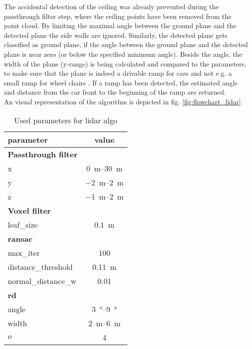 The accidental detection of the ceiling was already prevented during the passthrough filter step, where the ceiling points have been removed from the point cloud.
By limiting the maximal angle between the ground plane and the detected plane the side walls are ignored.
Similarly, the detected plane gets classified as ground plane, if the angle between the ground plane and the detected plane is near zero (or below the specified minimum angle).
Beside the angle, the width of the plane (y-range) is being calculated and compared to the parameters, to make sure that the plane is indeed a drivable ramp for cars and not e.g. a small ramp for wheel chairs .
If a ramp has been detected, the estimated angle and distance from the car front to the beginning of the ramp are returned.\\
An visual representation of the algorithm is depicted in fig. \ref{fig:flowchart_lidar}.
\begin{table}[H]
	\centering
	\caption{Used parameters for lidar algo}
	\label{tab:lidar_params}
	\begin{tabular}[t]{lc}
	\toprule
	\textbf{parameter}  &\textbf{value} \\
	\midrule
    \textbf{Passthrough filter}\\
	x 				    & \SIrange{0}{30}{\metre}\\
    y 				    & \SIrange{-2}{2}{\metre}\\
	z                   & \SIrange{-1}{2}{\metre}\\
	\midrule
    \textbf{Voxel filter}\\
    leaf\_size          & \SI{0.1}{\metre}\\
    \midrule
    \textbf{\gls{ransac}}\\
    max\_iter           & 100\\
    distance\_threshold & \SI{0.11}{\metre}\\
    normal\_distance\_w & 0.01\\
    \midrule
    \textbf{rd}\\
    angle               & \SIrange{3}{9}{\degree}\\
    width               & \SIrange{2}{6}{\metre}\\
    $o$                 & 4\\
	\bottomrule
	\end{tabular}
\end{table}%



